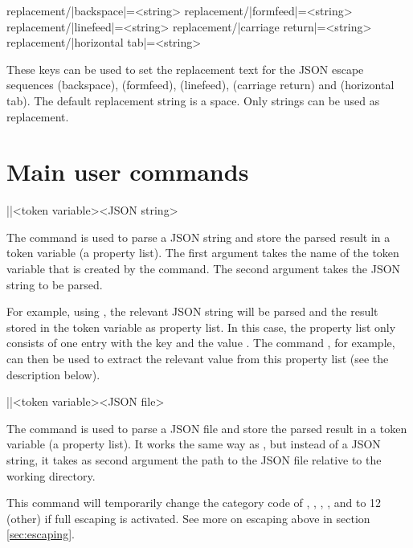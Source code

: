 \documentclass[a4paper]{article}
\begin{document}
{{\begin{macrodef}
replacement/|backspace|={<string>}
replacement/|formfeed|={<string>}
replacement/|linefeed|={<string>}
replacement/|carriage return|={<string>}
replacement/|horizontal tab|={<string>}
\end{macrodef}
These keys can be used to set the replacement text for the JSON escape sequences \macro{\b} (backspace), \macro{\f} (formfeed), \macro{\n} (linefeed), \macro{\r} (carriage return) and \macro{\t} (horizontal tab). The default replacement string is a space. Only strings can be used as replacement.

\section{Main user commands}

\begin{macrodef}
|\JSONParse|{<token variable>}{<JSON string>}
\end{macrodef}
The command \macro{\JSONParse} is used to parse a JSON string and store the parsed result in a token variable (a property list). The first argument takes the name of the token variable that is created by the command. The second argument takes the JSON string to be parsed. 

For example, using , the relevant JSON string will be parsed and the result stored in the token variable \macro{\myJSONdata} as property list. In this case, the property list only consists of one entry with the key  and the value . The command , for example, can then be used to extract the relevant value from this property list (see the description below). 

\begin{macrodef}
|\JSONParseFromFile|{<token variable>}{<JSON file>}
\end{macrodef}
The command \macro{\JSONParseFromFile} is used to parse a JSON file and store the parsed result in a token variable (a property list). It works the same way as \macro{\JSONParse}, but instead of a JSON string, it takes as second argument the path to the JSON file relative to the working directory.

This command will temporarily change the category code of , , , ,  and  to 12 (other) if full escaping is activated. See more on escaping above in section \ref{sec:escaping}. 

}}
\end{document}

